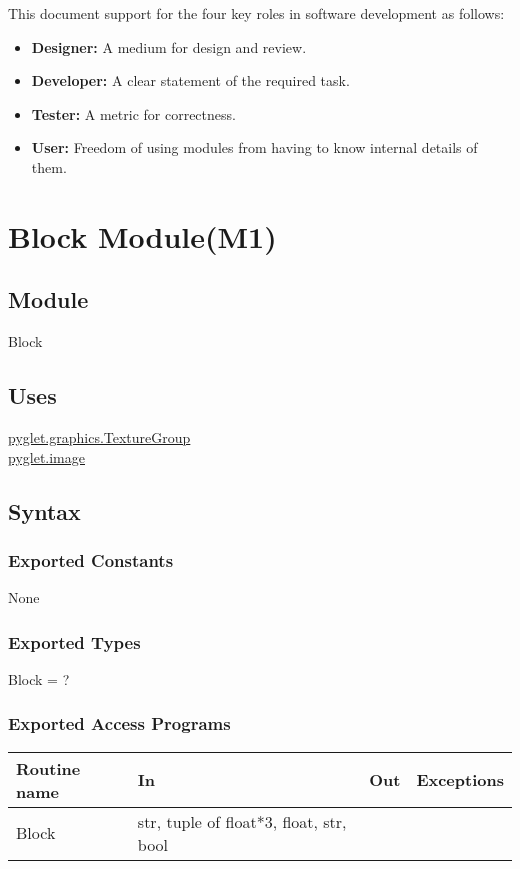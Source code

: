 \documentclass{article}
\begin{document}
This document support for the four key roles in software development as follows:
\begin{itemize}
    \item \textbf{Designer:} A medium for design and review.
    \item \textbf{Developer:} A clear statement of the required task.
    \item \textbf{Tester:} A metric for correctness.
    \item \textbf{User:} Freedom of using modules from having to know internal details of them.
\end{itemize}
\newpage



\section {Block Module(M1)}

\subsection{Module}
Block

\subsection {Uses}
\href{https://pyglet.readthedocs.io/en/latest/modules/graphics/#pyglet.graphics.TextureGroup}{pyglet.graphics.TextureGroup}\\
\href{https://pyglet.readthedocs.io/en/latest/modules/image/index.html}{pyglet.image} 

\subsection {Syntax}

\subsubsection {Exported Constants}
None

\subsubsection {Exported Types}
Block = ?

\subsubsection {Exported Access Programs}
\begin{table}[!htbp]
\begin{tabular}{| l | l | l | l |}
\hline
\textbf{Routine name} & \textbf{In} & \textbf{Out} & \textbf{Exceptions}\\
\hline
Block & str, tuple of float*3, float, str, bool & ~ & ~\\
\hline
\end{tabular}

\end{table}
\FloatBarrier
\end{document}
